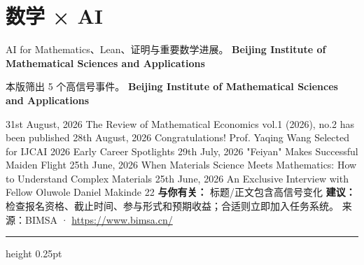 \documentclass[10.5pt]{ctexart}
\begin{document}
\section*{数学 × AI}
{\color{ormuted} AI for Mathematics、Lean、证明与重要数学进展。}
\vspace{2mm}
{\LARGE\bfseries Beijing Institute of Mathematical Sciences and Applications}\par
\vspace{1mm}
{\color{ormuted} 本版筛出 5 个高信号事件。}
\vspace{3mm}
{\Large\bfseries Beijing Institute of Mathematical Sciences and Applications}\par
31st August, 2026 The Review of Mathematical Economics vol.1 (2026), no.2 has been published 28th August, 2026 Congratulations! Prof. Yaqing Wang Selected for IJCAI 2026 Early Career Spotlights 29th July, 2026 "Feiyan" Makes Successful Maiden Flight 25th June, 2026 When Materials Science Meets Mathematics: How to Understand Complex Materials 25th June, 2026 An Exclusive Interview with Fellow Oluwole Daniel Makinde 22
\textbf{与你有关：} 标题/正文包含高信号变化
\textbf{建议：} 检查报名资格、截止时间、参与形式和预期收益；合适则立即加入任务系统。
{\footnotesize\color{ormuted} 来源：BIMSA · \url{https://www.bimsa.cn/}}
\vspace{4mm}
\hrule height 0.25pt
\vspace{3mm}
\end{document}
